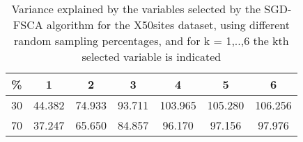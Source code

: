 \begin{table}
	\begin{center}
		\begin{tabular}{c c c c c c c}
			\% & 1 & 2 & 3 & 4 & 5 & 6 \\
			\hline
			30 & 44.382 & 74.933 & 93.711 & 103.965 & 105.280 & 106.256 \\
			70 & 37.247 & 65.650 & 84.857 & 96.170 & 97.156 & 97.976 \\
		\end{tabular}
	\end{center}
	\caption{Variance explained by the variables selected by the SGD-FSCA algorithm for the X50sites dataset, using different random sampling percentages, and for k = 1,..,6 the kth selected variable is indicated}
\end{table}